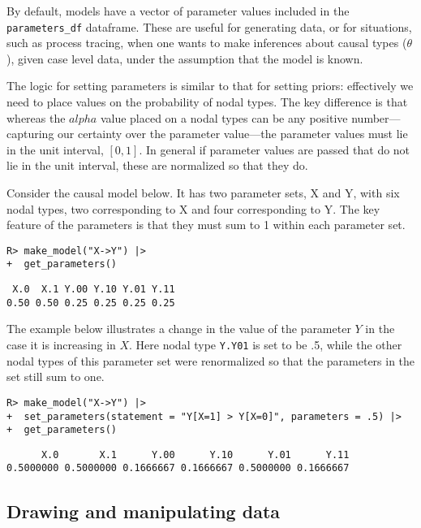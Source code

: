 \documentclass[
  11pt,
  article]{jss}
\begin{document}
By default, models have a vector of parameter values included in the
\texttt{parameters\_df} dataframe. These are useful for generating data,
or for situations, such as process tracing, when one wants to make
inferences about causal types (\(\theta\)), given case level data, under
the assumption that the model is known.

The logic for setting parameters is similar to that for setting priors:
effectively we need to place values on the probability of nodal types.
The key difference is that whereas the \(alpha\) value placed on a nodal
types can be any positive number---capturing our certainty over the
parameter value---the parameter values must lie in the unit interval,
\([0,1]\). In general if parameter values are passed that do not lie in
the unit interval, these are normalized so that they do.

Consider the causal model below. It has two parameter sets, X and Y,
with six nodal types, two corresponding to X and four corresponding to
Y. The key feature of the parameters is that they must sum to 1 within
each parameter set.

\begin{verbatim}
R> make_model("X->Y") |> 
+  get_parameters()
\end{verbatim}

\begin{verbatim}
 X.0  X.1 Y.00 Y.10 Y.01 Y.11 
0.50 0.50 0.25 0.25 0.25 0.25 
\end{verbatim}

The example below illustrates a change in the value of the parameter
\(Y\) in the case it is increasing in \(X\). Here nodal type
\texttt{Y.Y01} is set to be .5, while the other nodal types of this
parameter set were renormalized so that the parameters in the set still
sum to one.

\begin{verbatim}
R> make_model("X->Y") |>
+  set_parameters(statement = "Y[X=1] > Y[X=0]", parameters = .5) |>
+  get_parameters()
\end{verbatim}

\begin{verbatim}
      X.0       X.1      Y.00      Y.10      Y.01      Y.11 
0.5000000 0.5000000 0.1666667 0.1666667 0.5000000 0.1666667 
\end{verbatim}

\hypertarget{drawing-and-manipulating-data}{%
\subsection{Drawing and manipulating
data}\label{drawing-and-manipulating-data}}
\end{document}
